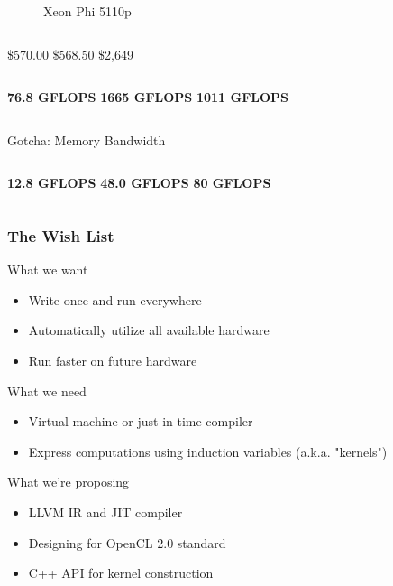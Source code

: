 \documentclass[12pt]{beamer}
\begin{document}
\begin{frame}
\begin{columns}
\begin{figure}
\caption{Xeon Phi 5110p}
\end{figure}
\end{columns}
\pause
\begin{columns}
\centering
\$570.00
\centering
\$568.50
\centering
\$2,649
\end{columns}
\pause
\begin{columns}
\centering
\textbf{76.8 GFLOPS}
\centering
\textbf{1665 GFLOPS}
\centering
\textbf{1011 GFLOPS}
\end{columns}
\pause
\begin{alertblock}{Gotcha: Memory Bandwidth}
\begin{columns}
\centering
\textbf{12.8 GFLOPS}
\centering
\textbf{48.0 GFLOPS}
\centering
\textbf{80 GFLOPS}
\end{columns}
\end{alertblock}
\end{frame}

\begin{frame}
\frametitle{The Wish List}
\begin{block}{What we want}
  \begin{itemize}
  \item Write once and run everywhere
  \item Automatically utilize all available hardware
  \item Run faster on future hardware
  \end{itemize}
\end{block}
\pause
\begin{block}{What we need}
  \begin{itemize}
  \item Virtual machine or just-in-time compiler
  \item Express computations using induction variables (a.k.a. "kernels")
  \end{itemize}
\end{block}
\pause
\begin{block}{What we're proposing}
  \begin{itemize}
  \item LLVM IR and JIT compiler
  \item Designing for OpenCL 2.0 standard
  \item C++ API for kernel construction
  \end{itemize}
\end{block}
\end{frame}
\end{document}
